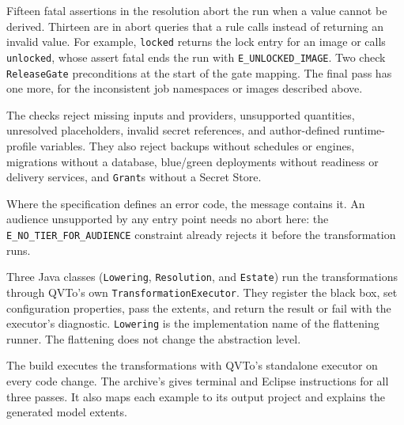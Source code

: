 Fifteen fatal assertions in the resolution abort the run when a value cannot
be derived. Thirteen are in abort queries that a rule calls instead of
returning an invalid value. For example, \texttt{locked} returns the lock
entry for an image or calls \texttt{unlocked}, whose assert fatal ends the
run with \texttt{E\_UNLOCKED\_IMAGE}. Two check \texttt{ReleaseGate}
preconditions at the start of the gate mapping. The final pass has one
more, for the inconsistent job namespaces or images described above.

The checks reject missing inputs and providers, unsupported quantities,
unresolved placeholders, invalid secret references, and author-defined
runtime-profile variables. They also reject backups without schedules or
engines, migrations without a database, blue/green deployments without
readiness or delivery services, and \texttt{Grant}s without a Secret Store.

Where the specification defines an error code, the message contains it. An
audience unsupported by any entry point needs no abort here: the
\texttt{E\_NO\_TIER\_FOR\_AUDIENCE} constraint already rejects it before
the transformation runs.

Three Java classes (\texttt{Lowering}, \texttt{Resolution}, and
\texttt{Estate}) run the transformations through QVTo's own
\texttt{TransformationExecutor}. They register the black box, set
configuration properties, pass the extents, and return the result or fail
with the executor's diagnostic. \texttt{Lowering} is the implementation name
of the flattening runner. The flattening does not change the abstraction level.

The build executes the transformations with QVTo's standalone executor on
every code change. The archive's  gives terminal and Eclipse
instructions for all three passes. It also maps each example to its output
project and explains the generated model extents.
